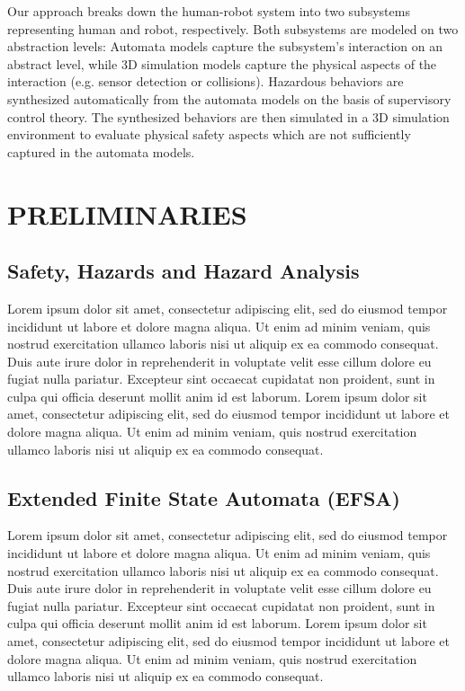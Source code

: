 \documentclass[letterpaper, 10 pt, conference]{ieeeconf}  %
\begin{document}
Our approach breaks down the human-robot system into two subsystems representing human and robot, respectively. Both subsystems are modeled on two abstraction levels: Automata models capture the subsystem's interaction on an abstract level, while 3D simulation models capture the physical aspects of the interaction (e.g. sensor detection or collisions). Hazardous behaviors are synthesized automatically from the automata models on the basis of supervisory control theory. The synthesized behaviors are then simulated in a 3D simulation environment to evaluate physical safety aspects which are not sufficiently captured in the automata models.

\section{PRELIMINARIES}
\label{sec:preliminaries}
\subsection{Safety, Hazards and Hazard Analysis}
Lorem ipsum dolor sit amet, consectetur adipiscing elit, sed do eiusmod tempor incididunt ut labore et dolore magna aliqua. Ut enim ad minim veniam, quis nostrud exercitation ullamco laboris nisi ut aliquip ex ea commodo consequat. Duis aute irure dolor in reprehenderit in voluptate velit esse cillum dolore eu fugiat nulla pariatur. Excepteur sint occaecat cupidatat non proident, sunt in culpa qui officia deserunt mollit anim id est laborum. Lorem ipsum dolor sit amet, consectetur adipiscing elit, sed do eiusmod tempor incididunt ut labore et dolore magna aliqua. Ut enim ad minim veniam, quis nostrud exercitation ullamco laboris nisi ut aliquip ex ea commodo consequat. 

\subsection{Extended Finite State Automata (EFSA)}
Lorem ipsum dolor sit amet, consectetur adipiscing elit, sed do eiusmod tempor incididunt ut labore et dolore magna aliqua. Ut enim ad minim veniam, quis nostrud exercitation ullamco laboris nisi ut aliquip ex ea commodo consequat. Duis aute irure dolor in reprehenderit in voluptate velit esse cillum dolore eu fugiat nulla pariatur. Excepteur sint occaecat cupidatat non proident, sunt in culpa qui officia deserunt mollit anim id est laborum. Lorem ipsum dolor sit amet, consectetur adipiscing elit, sed do eiusmod tempor incididunt ut labore et dolore magna aliqua. Ut enim ad minim veniam, quis nostrud exercitation ullamco laboris nisi ut aliquip ex ea commodo consequat. 
\end{document}
